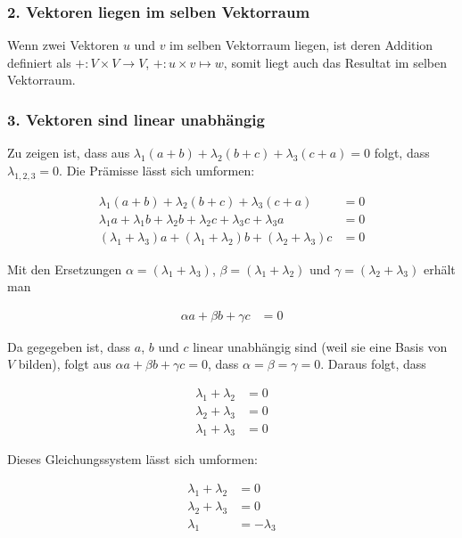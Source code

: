 \documentclass[a4paper,german,12pt,smallheadings]{scrartcl}
\begin{document}
\subsubsection*{2. Vektoren liegen im selben Vektorraum}
Wenn zwei Vektoren $u$ und $v$ im selben Vektorraum liegen, ist deren Addition
definiert als $+: V \times V \to V$, $+: u \times v \mapsto w$, somit liegt
auch das Resultat im selben Vektorraum.

\subsubsection*{3. Vektoren sind linear unabhängig}

Zu zeigen ist, dass aus $\lambda_1 (a+b) + \lambda_2 (b+c) + \lambda_3 (c+a) =
0$ folgt, dass $\lambda_{1,2,3} = 0$. Die Prämisse lässt sich umformen:

\begin{align*}
  \lambda_1 (a+b) + \lambda_2 (b+c) + \lambda_3 (c+a) &= 0 \\
  \lambda_1 a + \lambda_1 b + \lambda_2 b + \lambda_2 c + \lambda_3 c + \lambda_3 a &= 0 \\
  (\lambda_1 + \lambda_3) a + (\lambda_1 + \lambda_2) b + (\lambda_2 + \lambda_3) c &= 0
\end{align*}

Mit den Ersetzungen $\alpha = (\lambda_1 + \lambda_3)$, $\beta = (\lambda_1 +
\lambda_2)$ und $\gamma = (\lambda_2 + \lambda_3)$ erhält man

\begin{align*}
  \alpha a + \beta b + \gamma c &= 0
\end{align*}

Da gegegeben ist, dass $a$, $b$ und $c$ linear unabhängig sind (weil sie eine
Basis von $V$ bilden), folgt aus $\alpha a + \beta b + \gamma c = 0$, dass $\alpha =
\beta = \gamma = 0$. Daraus folgt, dass

\begin{align*}
  \lambda_1 + \lambda_2 &= 0 \\
  \lambda_2 + \lambda_3 &= 0 \\
  \lambda_1 + \lambda_3 &= 0
\end{align*}

Dieses Gleichungssystem lässt sich umformen:

\begin{align*}
  \lambda_1 + \lambda_2 &= 0 \\
  \lambda_2 + \lambda_3 &= 0 \\
  \lambda_1 &= -\lambda_3
\end{align*}
\end{document}
